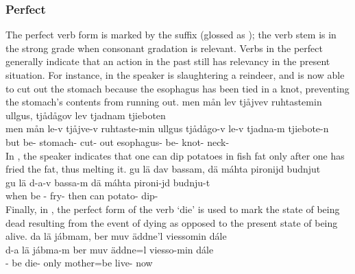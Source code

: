 \subsubsection{Perfect}\label{perfectAspect}
The perfect verb form is marked by the suffix  (glossed as \PRFs); the verb stem is in the strong grade when consonant gradation is relevant. Verbs in the perfect generally indicate that an action in the past still has relevancy in the present situation. For instance, in  the speaker is slaughtering a reindeer, and is now able to cut out the stomach because the esophagus has been tied in a knot, preventing the stomach’s contents from running out. 
\ea\label{perfectEx1}%
\glll	men mån lev tjåjvev ruhtastemin ullgus, tjådågov lev tjadnam tjieboten\\
	men mån le-v tjåjve-v ruhtaste-min ullgus tjådågo-v le-v tjadna-m tjiebote-n\\
	but  be- stomach- cut- out esophagus- be- knot- neck-\\\nopagebreak
{}	
\z
In , the speaker indicates that one can dip potatoes in fish fat only after one has fried the fat, thus melting it.
\ea\label{perfectEx2}%
\glll	gu lä dav bassam, dä máhta pironijd budnjut\\
	gu lä d-a-v bassa-m dä máhta pironi-jd budnju-t\\
	when be\BS{} -\BS{} fry- then can\BS{} potato- dip-\\\nopagebreak
{}	
\z
Finally, in , the perfect form of the verb  ‘die’ is used 
to mark the state of being dead resulting from the event of dying as opposed to the present state of being alive. 
\ea\label{perfectEx3}%
\glll	da lä jábmam, ber muv äddne'l viessomin dále\\
	d-a lä jábma-m ber muv äddne=l viesso-min dále\\
	-\BS{} be\BS{} die- only  mother\BS{}=be\BS{} live- now\\\nopagebreak
{}	
\z

